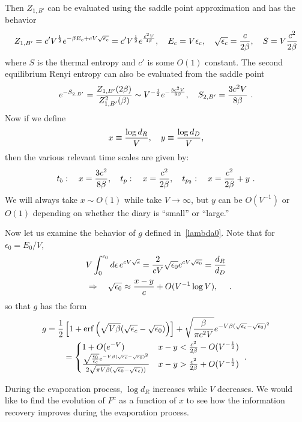 \documentclass[a4paper,11pt]{article}
\newcommand\half{{\ensuremath{\frac{1}{2}}}}
\newcommand{\be}{\begin{equation}}
\newcommand{\ee}{\end{equation}}
\newcommand{\bega}{\begin{gather}}
\newcommand{\bca}{\begin{cases}}
\newcommand{\eca}{\end{cases}}
\def\b{{\beta}}
\newcommand\ep{\epsilon}
\newcommand\ov{\over}
\newcommand\ha{{\half}}
\def\le{\left}
\def\ri{\right}
\begin{document}
\begin{enumerate}
\begin{appendix}
Then $Z_{1,B'}$ can be evaluated using the saddle point approximation and has the behavior 
\be 
Z_{1,B'} = c' V^\ha e^{- \b E_c + c V \sqrt{\ep_c}} = c' V^\ha e^{{c^2 V \ov 4 \b}} , \quad E_c = V \ep_c , \quad \sqrt{\ep_c} = {c \ov 2 \b} , \quad S =V {c^2 \ov 2 \b} 
\ee
where $S$ is the thermal entropy and $c'$ is some $O(1)$ constant. The second equilibrium Renyi entropy can also be evaluated from the saddle point 
\be
e^{- S_{2,B'}} = {Z_{1,B'} (2 \b) \ov Z_{1,B'}^2 (\b)} \sim V^{-\ha} e^{-{3 c^2 V \ov 8 \b}} , \quad S_{2, B'} = {3 c^2 V \ov 8 \b} \ .
\ee
Now if we define 
\be
x \equiv {\log d_R \ov V} , \quad y \equiv {\log d_D \ov V}, 
\ee
then the various relevant time scales are given by:
\be
t_b: \quad x = {3 c^2 \ov 8 \b}, \quad t_p: \quad x = {c^2 \ov 2 \b} , \quad t_{p_2}: \quad x = {c^2 \ov 2 \b} + y \ .
\ee
We will always take $x \sim O(1)$ while take $V \to \infty$, but $y$ can be $O(V^{-1})$ or $O(1)$ depending on whether the diary is ``small'' or ``large.'' 

Now let us examine the behavior of $g$ defined in~\eqref{lambda0}. Note that for $\epsilon_0 = E_0/V$, 
\bega 
V \int_0^{\ep_0} d\ep \, e^{c V \sqrt{\ep}} = {2 \ov c V} \sqrt{\ep_0} e^{c V \sqrt{\ep_0}} = {d_R \ov d_D} \\
\quad \Rightarrow \quad \sqrt{\ep_0} \approx {x - y \ov c} + O(V^{-1} \log V ), \quad  \ .
 \end{gather} 
 so that $g$ has the form 
 \bega 
 g = \ha \le[1 +{\rm erf} \le(\sqrt{V \b} (\sqrt{\ep_c} - \sqrt{\ep_0}) \ri) \ri] + 
\sqrt{\b \ov\pi c^2 V} e^{- V \b (\sqrt{\ep_c} - \sqrt{\ep_0})^2}  \\
 = \bca 
 1 + O(e^{-V}) & x-y < {c^2 \ov 2 \b} - O(V^{-\ha}) \cr
 {\sqrt{\ep_0 \ov \ep_c} e^{- V \b (\sqrt{\ep_c} - \sqrt{\ep_0})^2} \ov 2 \sqrt{\pi V \b} \le(\sqrt{\ep_0} - \sqrt{\ep_c}) \ri)} & x-y > {c^2 \ov 2 \b} + O(V^{-\ha}) \cr
 \eca \ .
 \label{23}
 \end{gather} 
 
During the evaporation process, $\log d_R$ increases while $V$ decreases. We would like to find the evolution of $F^c$ as a function of $x$ to see how the information recovery improves during the evaporation process. 



\end{appendix}
\end{enumerate}
\end{document}
